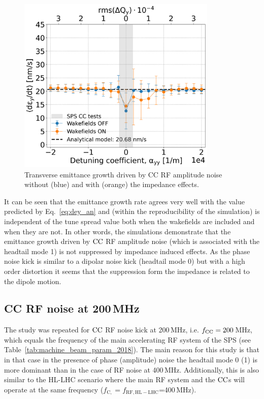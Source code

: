 \begin{figure}[!h] %
    \centering         
    \includegraphics[width=0.85\textwidth]{images/Ch7/deyRates_final_2018_AN_sps_270GeV_AN1e-8_400MHz_y-plane_QpxQpy5e-1_6D_Nb5e5_intensity3e10_ayyScan_wakesON_vs_OFF_vs_TuneSpreadvsExpectedSPS.png}
        \caption{Transverse emittance growth driven by CC RF amplitude noise without (blue) and with (orange) the impedance effects.}
        \label{fig:study_1_2018_paramters_AN}
 \end{figure}

 It can be seen that the emittance growth rate agrees very well with the value predicted by Eq.~\eqref{eq:dey_an} and (within the reproducibility of the simulation) is independent of the tune spread value both when the wakefields are included and when they are not. In other words, the simulations demonstrate that the emittance growth driven by ${\mathrm{CC}}$ RF amplitude noise (which is associated with the headtail mode 1) is not suppressed by impedance induced effects. As the phase noise kick is similar to a dipolar noise kick (headtail mode 0) but with a high order distortion it seems that the suppression form the impedance is related to the dipole motion.


 \subsection{CC RF noise at 200\,MHz}\label{subsec:fcc_200MHz}
The study was repeated for ${\mathrm{CC}}$ RF noise kick at 200\,MHz, i.e. ${f_\mathrm{CC}}=200$\,MHz, which equals the frequency of the main accelerating RF system of the SPS (see Table~\ref{tab:machine_beam_param_2018}). The main reason for this study is that in that case in the presence of phase (amplitude) noise the headtail mode 0 (1) is more dominant than in the case of RF noise at 400\,MHz. Additionally, this is also similar to the HL-LHC scenario where the main RF system and the ${\mathrm{CC}}$s will operate at the same frequency ($f_\mathrm{C, }=f_\mathrm{RF, HL-LHC}$=400\,MHz).

